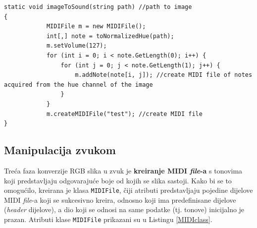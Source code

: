 \documentclass[12pt,a4paper]{article}
\begin{document}
\begin{lstlisting}[language={[Sharp]C}, caption={Funkcija \texttt{imageToSound} za kreiranje audio \textit{file}-a}, label={image2}]
static void imageToSound(string path) //path to image
{
            MIDIFile m = new MIDIFile();
            int[,] note = toNormalizedHue(path);
            m.setVolume(127);
            for (int i = 0; i < note.GetLength(0); i++) {
                for (int j = 0; j < note.GetLength(1); j++) {
                    m.addNote(note[i, j]); //create MIDI file of notes acquired from the hue channel of the image
                }
            }
            m.createMIDIFile("test"); //create MIDI file
}
\end{lstlisting}

\newpage

\subsection{Manipulacija zvukom}

Treća faza konverzije RGB slika u zvuk je \textbf{kreiranje MIDI \textit{file}-a} s tonovima koji predstavljaju odgovarajuće boje od kojih se slika sastoji. Kako bi se to omogućilo, kreirana je klasa \texttt{MIDIFile}, čiji atributi predstavljaju pojedine dijelove MIDI \textit{file}-a koji se sukcesivno kreira, odnosno koji ima predefinisane dijelove (\textit{header} dijelove), a dio koji se odnosi na same podatke (tj. tonove) inicijalno je prazan. Atributi klase \texttt{MIDIFile} prikazani su u Listingu \ref{MIDIclass}.
\end{document}
